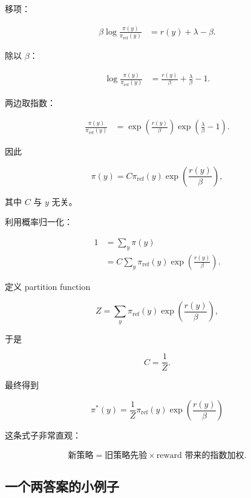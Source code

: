 \documentclass[11pt,a4paper]{ctexart}
\newcommand{\piref}{\pi_{\mathrm{ref}}}
\begin{document}
移项：

\begin{align}
\beta
\log\frac{\pi(y)}{\piref(y)}
&=
r(y)+\lambda-\beta.
\end{align}

除以 $\beta$：

\begin{align}
\log\frac{\pi(y)}{\piref(y)}
&=
\frac{r(y)}{\beta}
+
\frac{\lambda}{\beta}
-1.
\end{align}

两边取指数：

\begin{align}
\frac{\pi(y)}{\piref(y)}
&=
\exp
\left(
\frac{r(y)}{\beta}
\right)
\exp
\left(
\frac{\lambda}{\beta}-1
\right).
\end{align}

因此

\begin{equation}
\pi(y)
=
C
\piref(y)
\exp
\left(
\frac{r(y)}{\beta}
\right),
\end{equation}

其中 $C$ 与 $y$ 无关。

利用概率归一化：

\begin{align}
1
&=
\sum_y\pi(y)
\\
&=
C
\sum_y
\piref(y)
\exp
\left(
\frac{r(y)}{\beta}
\right).
\end{align}

定义 partition function

\begin{equation}
Z
=
\sum_y
\piref(y)
\exp
\left(
\frac{r(y)}{\beta}
\right),
\end{equation}

于是

\[
C=\frac{1}{Z}.
\]

最终得到

\begin{equation}
\boxed{
\pi^*(y)
=
\frac{1}{Z}
\piref(y)
\exp
\left(
\frac{r(y)}{\beta}
\right)
}
\label{eq:optimal_policy}
\end{equation}

这条式子非常直观：

\[
\boxed{
\text{新策略}
=
\text{旧策略先验}
\times
\text{reward 带来的指数加权}.
}
\]

\subsection{一个两答案的小例子}
\end{document}
